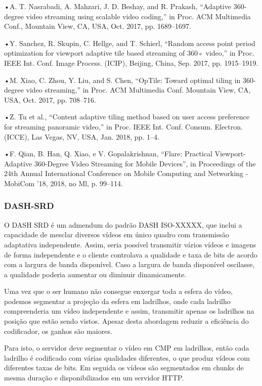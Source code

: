 •A. T. Nasrabadi, A. Mahzari, J. D. Beshay, and R. Prakash, “Adaptive 360-degree video streaming using scalable video coding,” in Proc. ACM Multimedia Conf., Mountain View, CA, USA, Oct. 2017, pp. 1689–1697.

•Y. Sanchez, R. Skupin, C. Hellge, and T. Schierl, “Random access point period optimization for viewport adaptive tile based streaming of 360◦ video,” in Proc. IEEE Int. Conf. Image Process. (ICIP), Beijing, China, Sep. 2017, pp. 1915–1919.

•M. Xiao, C. Zhou, Y. Liu, and S. Chen, “OpTile: Toward optimal tiling in 360-degree video streaming,” in Proc. ACM Multimedia Conf. Mountain View, CA, USA, Oct. 2017, pp. 708–716.

•Z. Tu et al., “Content adaptive tiling method based on user access preference for streaming panoramic video,” in Proc. IEEE Int. Conf. Consum. Electron. (ICCE), Las Vegas, NV, USA, Jan. 2018, pp. 1–4.

•F. Qian, B. Han, Q. Xiao, e V. Gopalakrishnan, “Flare: Practical Viewport-Adaptive 360-Degree Video Streaming for Mobile Devices”, in Proceedings of the 24th Annual International Conference on Mobile Computing and Networking - MobiCom ’18, 2018, no Ml, p. 99–114.

\subsubsection{DASH-SRD}
O DASH SRD é um admendum do padrão DASH ISO-XXXXX, que inclui a capacidade de mesclar diversos vídeos em único quadro com transmissão adaptativa independente. Assim, seria possível transmitir vários vídeos e imagens de forma independente e o cliente controlava a qualidade e taxa de bits de acordo com a largura de banda disponível. Caso a largura de banda disponível oscilasse, a qualidade poderia aumentar ou diminuir dinamicamente.

Uma vez que o ser humano não consegue enxergar toda a esfera do vídeo, podemos segmentar a projeção da esfera em ladrilhos, onde cada ladrilho compreenderia um vídeo independente e assim, transmitir apenas os ladrilhos na posição que estão sendo vistos. Apesar desta abordagem reduzir a eficiência do codificador, os ganhos são maiores.

Para isto, o servidor deve segmentar o vídeo em CMP em ladrilhos, então cada ladrilho é codificado com várias qualidades diferentes, o que produz vídeos com diferentes taxas de bits. Em seguida os vídeos são segmentados em chunks de mesma duração e disponibilizados em um servidor HTTP.

